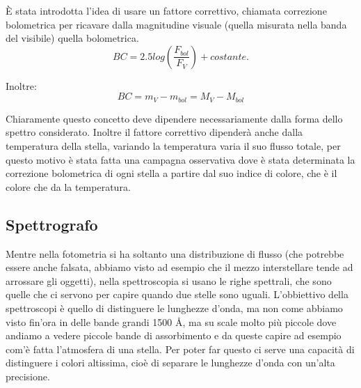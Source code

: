 \documentclass[a4paper,11pt]{article}
\begin{document}
    È stata introdotta l'idea di usare un fattore correttivo, chiamata correzione bolometrica per ricavare dalla magnitudine visuale (quella misurata nella banda del visibile) quella bolometrica.
    $$
        BC= 2.5 log \left( \frac{F_{bol}}{F_V} \right) + costante.
    $$
    
    Inoltre:
    $$
        BC= m_V - m_{bol} = M_V - M_{bol}
    $$
    
    Chiaramente questo concetto deve dipendere necessariamente dalla forma dello spettro considerato. Inoltre il fattore correttivo dipenderà anche dalla temperatura della stella, variando la temperatura varia il suo flusso totale, per questo motivo è stata fatta una campagna osservativa dove è stata determinata la correzione bolometrica di ogni stella a partire dal suo indice di colore, che è il colore che da la temperatura.
    
    \newpage
    \subsection{Spettrografo}
        Mentre nella fotometria si ha soltanto una distribuzione di flusso (che potrebbe essere anche falsata, abbiamo visto ad esempio che il mezzo interstellare tende ad arrossare gli oggetti), 
        nella spettroscopia si usano le righe spettrali, che sono quelle che ci servono per capire quando due stelle sono uguali. L'obbiettivo della spettroscopi è quello di distinguere le lunghezze d'onda, ma non come abbiamo visto fin'ora in delle bande grandi 1500 \AA, ma su scale molto più piccole dove andiamo a vedere piccole bande di assorbimento e da queste capire ad esempio com'è fatta l'atmosfera di una stella. Per poter far questo ci serve una capacità di distinguere i colori altissima, cioè di separare le lunghezze d'onda con un'alta precisione. 
        
\end{document}
